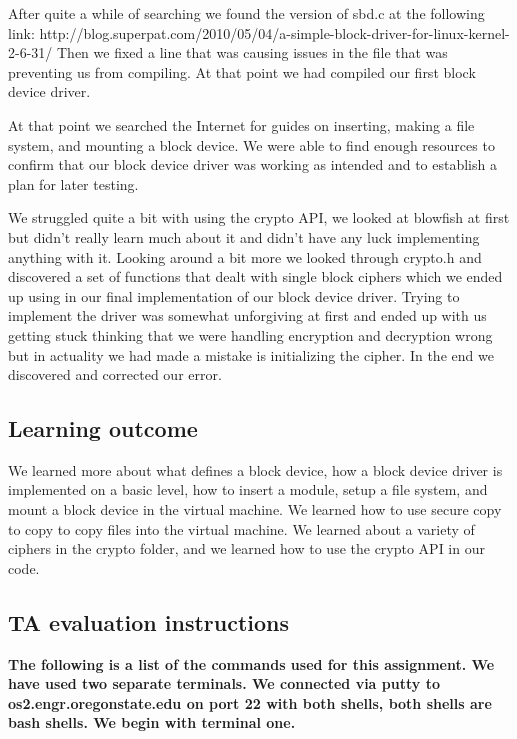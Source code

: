 \documentclass[journal,10pt,onecolumn,letterpaper,draftclsnofoot]{IEEEtran}
\begin{document}
After quite a while of searching we found the version of sbd.c at the following link:\newline
http://blog.superpat.com/2010/05/04/a-simple-block-driver-for-linux-kernel-2-6-31/\newline
Then we fixed a line that was causing issues in the file that was preventing us from compiling. At that point we had compiled our first block device driver.

At that point we searched the Internet for guides on inserting, making a file system, and mounting a block device. We were able to find enough resources to confirm that our block device driver was working as intended and to establish a plan for later testing.

We struggled quite a bit with using the crypto API, we looked at blowfish at first but didn't really learn much about it and didn't have any luck implementing anything with it. Looking around a bit more we looked through crypto.h and discovered a set of functions that dealt with single block ciphers which we ended up using in our final implementation of our block device driver. Trying to implement the driver was somewhat unforgiving at first and ended up with us getting stuck thinking that we were handling encryption and decryption wrong but in actuality we had made a mistake is initializing the cipher. In the end we discovered and corrected our error.

\subsection{Learning outcome}
We learned more about what defines a block device, how a block device driver is implemented on a basic level, how to insert a module, setup a file system, and mount a block device in the virtual machine. We learned how to use secure copy to copy to copy files into the virtual machine. We learned about a variety of ciphers in the crypto folder, and we learned how to use the crypto API in our code.

\subsection{TA evaluation instructions}

\textbf{The following is a list of the commands used for this assignment. We have used two separate terminals. We connected via putty to os2.engr.oregonstate.edu on port 22 with both shells, both shells are bash shells. We begin with terminal one.\newline}
\end{document}
